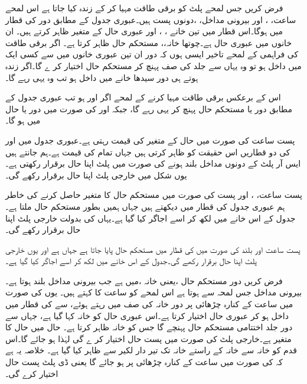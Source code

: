 فرض کریں جس لمحے پلٹ کو برقی طاقت مہیا کر کے زندہ کیا جاتا ہے اس لمحے ساعت، ، اور بیرونی مداخل،  ،دونوں پست ہیں۔عبوری جدول کے مطابق دور  کی قطار میں ہوگا۔اس قطار میں تین خانے ، ، اور  عبوری حال کے متغیر ظاہر کرتے ہیں۔ ان خانوں میں عبوری حال  ہے۔چوتھا خانہ،، مستحکم حال  ظاہر کرتا ہے۔ اگر برقی طاقت کی فراہمی کے لمحے تاخیر ایسی ہوں کہ دور ان تین عبوری خانوں میں سے کسی ایک میں داخل ہو تو وہ یہاں سے جلد  کی صف پہنچ کر مستحکم حال اختیار کر ے گا۔اگر زندہ ہوتے ہی دور سیدھا  خانے میں داخل ہو تب وہ یہی رہے گا۔

اس کے برعکس برقی طاقت مہیا کرنے کے لمحے اگر  اور  ہو تب عبوری جدول کے مطابق دور  یا  مستحکم حال پہنچ کر یہی رہے گا، جبکہ  اور  کی صورت میں دور  یا  حال میں ہو گا۔

پست ساعت کی صورت میں حال کے متغیر  کی قیمت  رہتی ہے۔عبوری جدول میں  اور  کی دو قطاریں اس حقیقت کو ظاہر کرتی ہیں جہاں تمام  کی قیمت  ہے۔ہم جانتے ہیں ایس آر پلٹ کے دونوں مداخل بلند ہونے کی صورت میں پلٹ اپنا حال برقرار رکھتی ہے۔یوں شکل  میں خارجی پلٹ اپنا حال برقرار رکھے گی۔

پست ساعت، ، اور پست  کی صورت میں مستحکم حال کا متغیر  حاصل کرنے کی خاطر ہم عبوری جدول کی  قطار میں دیکھتے ہیں جہاں ہمیں   بطور مستحکم حال ملتا ہے۔جدول کے اس خانے میں  لکھ کر اسے اجاگر کیا گیا ہے۔یہاں  کی بدولت خارجی پلٹ اپنا حال برقرار رکھے گی۔

پست ساعت اور بلند  کی صورت میں  کی قطار میں مستحکم حال  پایا جاتا ہے جہاں  ہے اور یوں خارجی پلٹ اپنا حال برقرار رکھے گی۔جدول کے اس خانے میں  لکھ کر اسے اجاگر کیا گیا ہے۔

فرض کریں دور مستحکم حال ،یعنی خانہ  ،میں ہے جب بیرونی مداخل  بلند ہوتا ہے۔بیرونی مداخل  جس لمحہ  سے  ہوتا ہے اس لمحے کو ساعت کا  کہتے ہیں۔ یوں  کی صورت میں ساعت کے کنارہ چڑھائی پر دور خانہ  کی صف میں رہتے ہوئے،  سے  کی قطار میں داخل ہو کر عبوری حال  اختیار کرتا ہے۔اس عبوری حال کو خانہ  کہا گیا ہے، جہاں سے دور جلد اختتامی مستحکم حال  پہنچے گا جس کو خانہ  ظاہر کرتا ہے۔ حال  میں حال کا متغیر  ہے۔خارجی پلٹ  کی صورت میں پست حال اختیار کر ے گی لہٰذا  ہو جائے گا۔اس قدم کو خانہ سے خانہ  کے راستے خانہ  تک تیر دار لکیر سے ظاہر کیا گیا ہے۔ خلاصہ یہ ہے کہ  کی صورت میں ساعت کے کنارہ چڑھائی پر  ہو جائے گا یعنی ڈی پلٹ پست حال اختیار کرے گی۔

